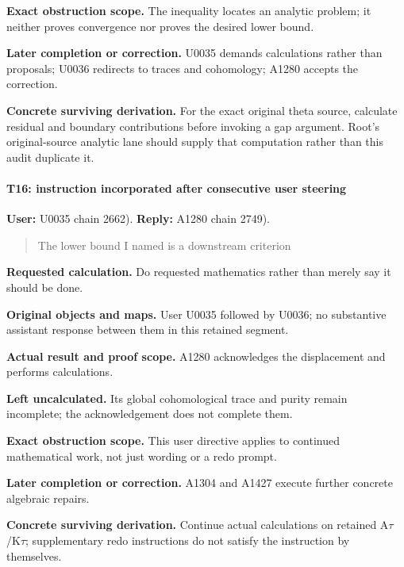 \textbf{Exact obstruction scope.} The inequality locates an analytic
problem; it neither proves convergence nor proves the desired lower
bound.

\textbf{Later completion or correction.} U0035 demands calculations
rather than proposals; U0036 redirects to traces and cohomology; A1280
accepts the correction.

\textbf{Concrete surviving derivation.} For the exact original theta
source, calculate residual and boundary contributions before invoking a
gap argument. Root's original-source analytic lane should supply that
computation rather than this audit duplicate it.

\paragraph{T16: instruction incorporated after consecutive user
steering}\label{t16-instruction-incorporated-after-consecutive-user-steering}

\textbf{User:} U0035
\protect{} chain 2662).
\textbf{Reply:} A1280
\protect{} chain 2749).

\begin{quote}
The lower bound I named is a downstream criterion
\end{quote}

\textbf{Requested calculation.} Do requested mathematics rather than
merely say it should be done.

\textbf{Original objects and maps.} User U0035 followed by U0036; no
substantive assistant response between them in this retained segment.

\textbf{Actual result and proof scope.} A1280 acknowledges the
displacement and performs
\protect{}
calculations.

\textbf{Left uncalculated.} Its global cohomological trace and purity
remain incomplete; the acknowledgement does not complete them.

\textbf{Exact obstruction scope.} This user directive applies to
continued mathematical work, not just wording or a redo prompt.

\textbf{Later completion or correction.} A1304 and A1427 execute further
concrete algebraic repairs.

\textbf{Concrete surviving derivation.} Continue actual calculations on
retained
A\allowbreak{}\ensuremath{τ}\allowbreak{}/K\allowbreak{}\ensuremath{τ}\allowbreak{};
supplementary redo instructions do not satisfy the instruction by
themselves.

